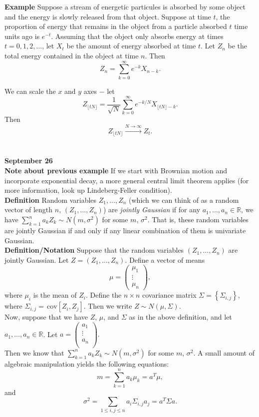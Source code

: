 \documentclass{article}
\theoremstyle{definition}
\newcommand{\R}{\mathbb{R}}
\newcommand{\cov}{\,\mathrm{cov}}
\newcommand{\style}{\displaystyle} %
\begin{document}
\textbf{Example} Suppose a stream of energetic particules is absorbed by some object and the energy is slowly released from that object.  Suppose at time $t$, the proportion of energy that remains in the object from a particle absorbed $t$ time units ago is $e^{-t}$.  Assuming that the object only absorbs energy at times $t=0,1,2,\dots$, let $X_t$ be the amount of energy absorbed at time $t$.  Let $Z_n$ be the total energy contained in the object at time $n$.  Then \[Z_n=\sum_{k=0}^\infty e^{-k}X_{n-k}.\]

We can scale the $x$ and $y$ axes $-$ let \[Z_{\lfloor tN\rfloor}=\frac{1}{\sqrt{N}}\sum_{k=0}^\infty e^{-k/N}X_{\lfloor tN\rfloor-k}.\]  Then \[Z_{\lfloor tN\rfloor}\xrightarrow{N\to\infty}Z_t.\] \\\\

\textbf{\Large September 26}\\

\textbf{Note about previous example} If we start with Brownian motion and incorporate exponential decay, a more general central limit theorem applies (for more information, look up Lindeberg-Feller condition).\\

\textbf{Definition} Random variables $Z_1,\dots,Z_n$ (which we can think of as a random vector of length $n$, $(Z_1,\dots,Z_n)$) are \emph{jointly Gaussian} if for any $a_1,\dots,a_n\in\R$, we have $\style\sum_{k=1}^n a_kZ_k\sim N(m,\sigma^2)$ for some $m$, $\sigma^2$.  That is, these random variables are jointly Gaussian if and only if any linear combination of them is univariate Gaussian.\\

\textbf{Definition/Notation} Suppose that the random variables $(Z_1,\dots,Z_n)$ are jointly Gaussian.  Let $Z=(Z_1,\dots,Z_n)$.  Define a vector of means \[\mu=\left(\begin{array}{ccc}
\mu_1 \\ \vdots \\ \mu_n
\end{array}\right),\] where $\mu_i$ is the mean of $Z_i$.  Define the $n\times n$ covariance matrix $\Sigma=\left\{\Sigma_{i,j}\right\}$, where $\Sigma_{i,j}=\cov[Z_i,Z_j]$.  Then we write $Z\sim N(\mu, \Sigma)$.\\

Now, suppose that we have $Z$, $\mu$, and $\Sigma$ as in the above definition, and let $a_1,\dots,a_n\in\R$.  Let $a=\left(\begin{array}{c}
a_1\\ \vdots\\ a_n\\
\end{array}\right).$\\ Then we know that $\style\sum_{k=1}^n a_kZ_k\sim N(m,\sigma^2)$ for some $m$, $\sigma^2$.  A small amount of algebraic manipulation yields the following equations:
\[m=\sum_{k=1}^n a_k\mu_k=a^T\mu,\] and \[\sigma^2=\sum_{1\leq i,j\leq n} a_i\Sigma_{i,j}a_j=a^T\Sigma a.\]\\
\end{document}
